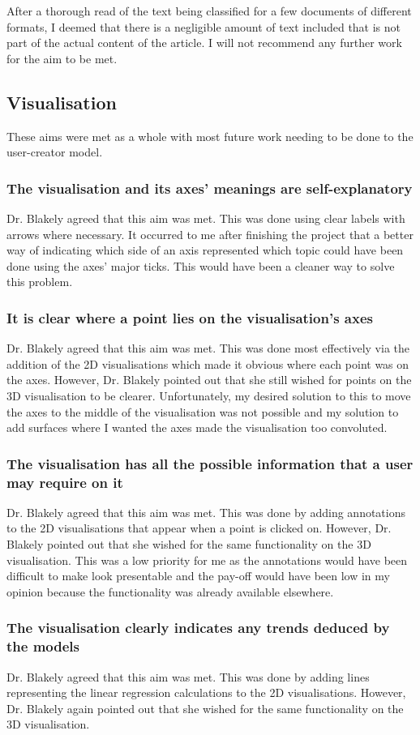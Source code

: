 				After a thorough read of the text being classified for a few documents of different formats, I deemed that there is a negligible amount of text included that is not part of the actual content of the article. I will not recommend any further work for the aim to be met.
		\subsection{Visualisation}
				These aims were met as a whole with most future work needing to be done to the user-creator model.
			\subsubsection{The visualisation and its axes' meanings are self-explanatory}
				Dr. Blakely agreed that this aim was met. This was done using clear labels with arrows where necessary. It occurred to me after finishing the project that a better way of indicating which side of an axis represented which topic could have been done using the axes' major ticks. This would have been a cleaner way to solve this problem. 
			\subsubsection{It is clear where a point lies on the visualisation's axes}
				Dr. Blakely agreed that this aim was met. This was done most effectively via the addition of the 2D visualisations which made it obvious where each point was on the axes.  However, Dr. Blakely pointed out that she still wished for points on the 3D visualisation to be clearer. Unfortunately, my desired solution to this to move the axes to the middle of the visualisation was not possible and my solution to add surfaces where I wanted the axes made the visualisation too convoluted. 
			\subsubsection{The visualisation has all the possible information that a user may require on it}
				Dr. Blakely agreed that this aim was met. This was done by adding annotations to the 2D visualisations that appear when a point is clicked on. However, Dr. Blakely pointed out that she wished for the same functionality on the 3D visualisation. This was a low priority for me as the annotations would have been difficult to make look presentable and the pay-off would have been low in my opinion because the functionality was already available elsewhere.  
			\subsubsection{The visualisation clearly indicates any trends deduced by the models}
				Dr. Blakely agreed that this aim was met. This was done by adding lines representing the linear regression calculations to the 2D visualisations. However, Dr. Blakely again pointed out that she wished for the same functionality on the 3D visualisation.  
